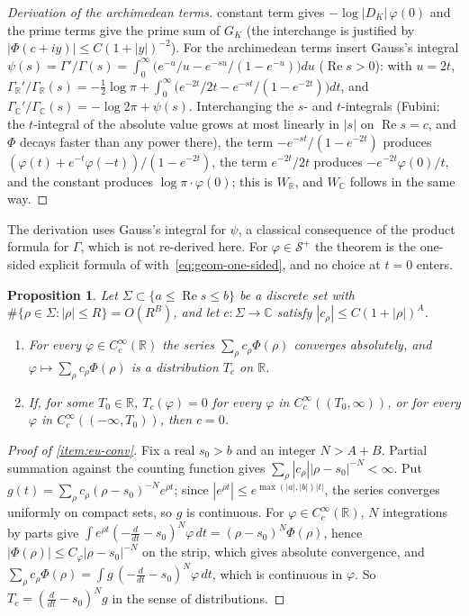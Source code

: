 \documentclass[11pt]{amsart}
\theoremstyle{plain}
\newtheorem{proposition}[theorem]{Proposition}
\theoremstyle{definition}
\theoremstyle{remark}
\numberwithin{equation}{section}
\newcommand{\C}{\mathbb{C}}
\newcommand{\R}{\mathbb{R}}
\newcommand{\GR}{\Gamma_{\mathbb{R}}}
\newcommand{\GC}{\Gamma_{\mathbb{C}}}
\DeclareMathOperator{\Rea}{Re}
\renewcommand{\Re}{\Rea}
\begin{document}
\begin{proof}[Derivation of the archimedean terms]
constant term gives $-\log|D_K|\,\varphi(0)$ and the prime terms give
the prime sum of $G_K$ (the interchange is justified by
$|\Phi(c+iy)|\le C(1+|y|)^{-2}$). For the archimedean terms insert
Gauss's integral
$\psi(s)=\Gamma'/\Gamma(s)=\int_0^\infty\bigl(e^{-u}/u
-e^{-su}/(1-e^{-u})\bigr)du$ ($\Re s>0$): with $u=2t$,
$\GR'/\GR(s)=-\tfrac12\log\pi+\int_0^\infty\bigl(e^{-2t}/2t
-e^{-st}/(1-e^{-2t})\bigr)dt$, and
$\GC'/\GC(s)=-\log2\pi+\psi(s)$. Interchanging the $s$- and
$t$-integrals (Fubini: the $t$-integral of the absolute value grows at
most linearly in $|s|$ on $\Re s=c$, and $\Phi$ decays faster than any
power there), the term $-e^{-st}/(1-e^{-2t})$ produces
$(\varphi(t)+e^{-t}\varphi(-t))/(1-e^{-2t})$, the term $e^{-2t}/2t$
produces $-e^{-2t}\varphi(0)/t$, and the constant produces
$\log\pi\cdot\varphi(0)$; this is $W_\R$, and $W_\C$ follows in the
same way.
\end{proof}

The derivation uses Gauss's integral for $\psi$, a classical
consequence of the product formula for $\Gamma$, which is not
re-derived here. For $\varphi\in\mathcal S^+$ the theorem is the
one-sided explicit formula of \cite[(18), p.~15]%
{Deninger2001NumberTheory} with~\eqref{eq:geom-one-sided}, and no
choice at $t=0$ enters.

\begin{proposition}\label{prop:exp-unique}
Let $\Sigma\subset\{a\le\Re s\le b\}$ be a discrete set with
$\#\{\rho\in\Sigma:|\rho|\le R\}=O(R^B)$, and let $c:\Sigma\to\C$
satisfy $|c_\rho|\le C(1+|\rho|)^A$.
\begin{enumerate}[label=(\roman*)]
\item\label{item:eu-conv} For every $\varphi\in C_c^\infty(\R)$ the
  series $\sum_\rho c_\rho\Phi(\rho)$ converges absolutely, and
  $\varphi\mapsto\sum_\rho c_\rho\Phi(\rho)$ is a distribution $T_c$ on
  $\R$.
\item\label{item:eu-tail} If, for some $T_0\in\R$, $T_c(\varphi)=0$
  for every $\varphi$ in $C_c^\infty((T_0,\infty))$, or for every
  $\varphi$ in $C_c^\infty((-\infty,T_0))$, then $c=0$.
\end{enumerate}
\end{proposition}

\begin{proof}[Proof of \ref{item:eu-conv}]
Fix a real $s_0>b$ and an integer $N>A+B$. Partial summation against
the counting function gives $\sum_\rho|c_\rho||\rho-s_0|^{-N}<\infty$.
Put $g(t)=\sum_\rho c_\rho(\rho-s_0)^{-N}e^{\rho t}$; since
$|e^{\rho t}|\le e^{\max(|a|,|b|)|t|}$, the series converges uniformly
on compact sets, so $g$ is continuous. For $\varphi\in C_c^\infty(\R)$,
$N$ integrations by parts give $\int e^{\rho t}(-\frac d{dt}-s_0)^N
\varphi\,dt=(\rho-s_0)^N\Phi(\rho)$, hence
$|\Phi(\rho)|\le C_\varphi|\rho-s_0|^{-N}$ on the strip, which gives
absolute convergence, and $\sum_\rho c_\rho\Phi(\rho)=\int g\,
(-\frac d{dt}-s_0)^N\varphi\,dt$, which is continuous in $\varphi$.
So $T_c=(\frac d{dt}-s_0)^Ng$ in the sense of distributions.
\end{proof}
\end{document}
